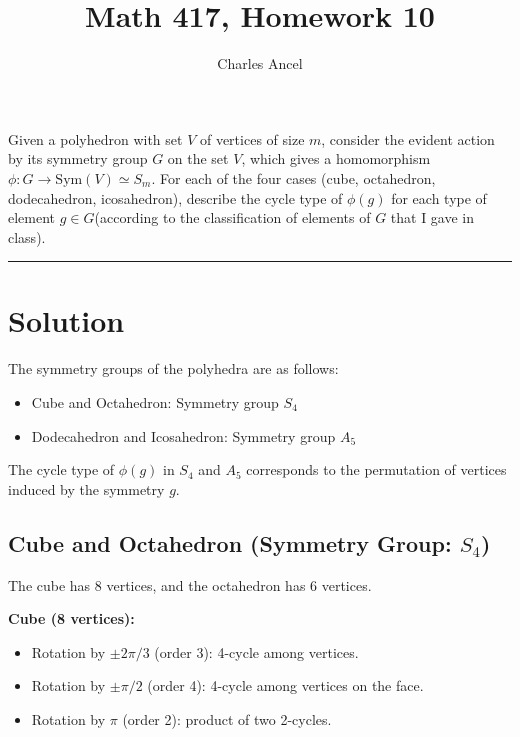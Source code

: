 \documentclass[12pt]{amsart}
\title{Math 417, Homework 10}
\author{Charles Ancel}
\theoremstyle{definition}
\numberwithin{equation}{section}
\begin{document}
\maketitle

\begin{exercise}{1} Given a polyhedron with set \(V\) of vertices of size \(m\), consider the evident action by its symmetry group \(G\) on the set \(V\), which gives a homomorphism \(\phi : G \rightarrow \text{Sym}(V) \simeq S_m\). For each of the four cases (cube, octahedron, dodecahedron, icosahedron), describe the cycle type of \(\phi(g)\) for each type of element \(g\in G\)(according to the classification of elements of \(G\) that I gave in class).

    \noindent\rule{\linewidth}{1pt}

    \section*{Solution}

    The symmetry groups of the polyhedra are as follows:
    \begin{itemize}[label=--]
        \item Cube and Octahedron: Symmetry group \(S_4\)
        \item Dodecahedron and Icosahedron: Symmetry group \(A_5\)
    \end{itemize}

    The cycle type of \(\phi(g)\) in \(S_4\) and \(A_5\) corresponds to the permutation of vertices induced by the symmetry \(g\). 

    \subsection*{Cube and Octahedron (Symmetry Group: \(S_4\))}

    The cube has 8 vertices, and the octahedron has 6 vertices. 

    \textbf{Cube (8 vertices):}
    \begin{itemize}
        \item Rotation by \(\pm 2\pi/3\) (order 3): 4-cycle among vertices.
        \item Rotation by \(\pm \pi/2\) (order 4): 4-cycle among vertices on the face.
        \item Rotation by \(\pi\) (order 2): product of two 2-cycles.
    \end{itemize}


\end{exercise}
\end{document}
